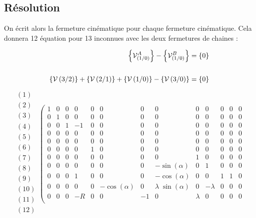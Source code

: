 \documentclass[10pt,fleqn]{article} %
\begin{document}
\subsection{Résolution}
On écrit alors la fermeture cinématique pour chaque fermeture cinématique. Cela donnera 12 équation pour 13 inconnues avec les deux fermetures de chaines :

\begin{align*}
\left\{{\mathcal{V}^{A}_{(1/0)}}\right\}-\left\{{\mathcal{V}^{B}_{(1/0)}}\right\}=\left\{0\right\}\\
\\
\left\{\mathcal{V} \left(3/2 \right) \right\}+	\left\{\mathcal{V} \left(2/1 \right) \right\}	
+	\left\{\mathcal{V} \left(1/0 \right) \right\}-\left\{\mathcal{V} \left(3/0 \right) \right\}	=\left\{0\right\}
\end{align*}
\begin{align*}
\begin{array}{c}
(1)\\
(2)\\
(3)\\
(4)\\
(5)\\
(6)\\
(7)\\
(8)\\
(9)\\
(10)\\
(11)\\
(12)\\
\end{array}
\left(
\begin{array}{ccccccccccccc}
1 & 0 & 0 & 0 & 0 & 0 & 0 & 0 & 0 & 0 & 0 & 0 & 0 \\
0 & 1 & 0 & 0 & 0 & 0 & 0 & 0 & 0 & 0 & 0 & 0 & 0 \\ 
0 & 0 & 1 & -1 & 0 & 0 & 0 & 0 & 0 & 0 & 0 & 0 & 0 \\ 
0 & 0 & 0 & 0 & 0 & 0 & 0 & 0 & 0 & 0 & 0 & 0 & 0 \\ 
0 & 0 & 0 & 0 & 0 & 0 & 0 & 0 & 0 & 0 & 0 & 0 & 0 \\ 
0 & 0 & 0 & 0 & 1 & 0 & 0 & 0 & 0 & 0 & 0 & 0 & 0 \\  
0 & 0 & 0 & 0 & 0 & 0 & 0 & 0 & 1 & 0 & 0 & 0 & 0 \\ 
0 & 0 & 0 & 0 & 0 & 0 & 0 & -\sin(\alpha) & 0 & 1 & 0 & 0 & 0 \\
0 & 0 & 0 & 1 & 0 & 0 & 0 & -\cos(\alpha) & 0 & 0 & 1 & 1 & 0 \\
0 & 0 & 0 & 0 & 0 & -\cos(\alpha) & 0 & \lambda \;\sin(\alpha) & 0 & -\lambda & 0 & 0 & 0 \\ 
0 & 0 & 0 & -R & 0 & 0 & -1 & 0 & \lambda & 0 & 0 & 0 & 0 \\

\end{array}
\end{align*}
\end{document}
